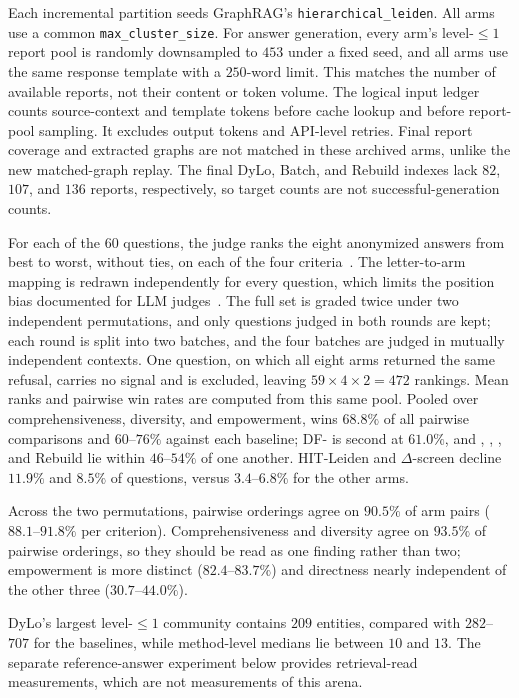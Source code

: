  Each incremental partition seeds GraphRAG's
\texttt{hierarchical\_leiden}. All arms use a common \texttt{max\_cluster\_size}.
For answer generation, every arm's level-$\le1$ report pool is randomly
downsampled to $453$ under a fixed seed, and all arms use the same response
template with a $250$-word limit. This matches the number of available reports,
not their content or token volume. The logical input ledger counts source-context and template tokens before
cache lookup and before report-pool sampling. It excludes output tokens and
API-level retries. Final report coverage and extracted graphs are not matched
in these archived arms, unlike the new matched-graph replay.
The final DyLo, Batch, and Rebuild indexes lack $82$, $107$, and $136$
reports, respectively, so target counts are not successful-generation counts.

 For each of the $60$ questions, the judge ranks
the eight anonymized answers from best to worst, without ties, on each of the
four criteria~\cite{edge2024graphrag}. The letter-to-arm mapping is redrawn
independently for every question, which limits the position bias documented
for LLM judges~\cite{zheng2023judging}. The full set is graded twice under two
independent permutations, and only questions judged in both rounds are kept;
each round is split into two batches, and the four batches are judged in
mutually independent contexts. One question,
on which all eight arms returned the same refusal, carries no signal and is
excluded, leaving $59\times4\times2=472$ rankings. Mean ranks and pairwise win
rates are computed from this same pool. Pooled over comprehensiveness,
diversity, and empowerment, \DyLo{} wins $68.8\%$ of all pairwise comparisons
and $60$--$76\%$ against each baseline; DF-\Louvain{} is second at $61.0\%$,
and \QCA{}, \DynaMo{}, \Batch{}, and Rebuild lie within $46$--$54\%$ of one
another. HIT-Leiden and $\Delta$-screen decline $11.9\%$ and $8.5\%$ of
questions, versus $3.4$--$6.8\%$ for the other arms.

 Across the two permutations, pairwise orderings agree on
$90.5\%$ of arm pairs ($88.1$--$91.8\%$ per criterion). Comprehensiveness and
diversity agree on $93.5\%$ of pairwise orderings, so they should be read as
one finding rather than two; empowerment is more distinct ($82.4$--$83.7\%$)
and directness nearly independent of the other three ($30.7$--$44.0\%$).

DyLo's largest level-$\le1$ community contains $209$ entities, compared with
$282$--$707$ for the baselines, while method-level medians lie between $10$ and
$13$. The separate reference-answer experiment below
provides retrieval-read measurements, which are not measurements of this arena.

